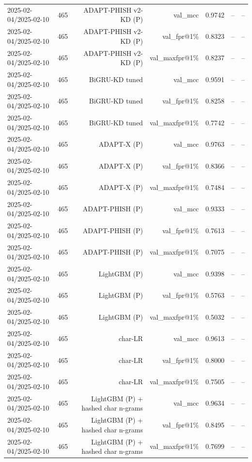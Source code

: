 \begin{table}[t]
\begin{tabular}{llrrrrr}
2025-02-04/2025-02-10 & 465 & ADAPT-PHISH v2-KD (P) & val\_mcc & 0.9742 & -- & -- \\
2025-02-04/2025-02-10 & 465 & ADAPT-PHISH v2-KD (P) & val\_fpr@1\% & 0.8323 & -- & -- \\
2025-02-04/2025-02-10 & 465 & ADAPT-PHISH v2-KD (P) & val\_maxfpr@1\% & 0.8237 & -- & -- \\
2025-02-04/2025-02-10 & 465 & BiGRU-KD tuned & val\_mcc & 0.9591 & -- & -- \\
2025-02-04/2025-02-10 & 465 & BiGRU-KD tuned & val\_fpr@1\% & 0.8258 & -- & -- \\
2025-02-04/2025-02-10 & 465 & BiGRU-KD tuned & val\_maxfpr@1\% & 0.7742 & -- & -- \\
2025-02-04/2025-02-10 & 465 & ADAPT-X (P) & val\_mcc & 0.9763 & -- & -- \\
2025-02-04/2025-02-10 & 465 & ADAPT-X (P) & val\_fpr@1\% & 0.8366 & -- & -- \\
2025-02-04/2025-02-10 & 465 & ADAPT-X (P) & val\_maxfpr@1\% & 0.7484 & -- & -- \\
2025-02-04/2025-02-10 & 465 & ADAPT-PHISH (P) & val\_mcc & 0.9333 & -- & -- \\
2025-02-04/2025-02-10 & 465 & ADAPT-PHISH (P) & val\_fpr@1\% & 0.7613 & -- & -- \\
2025-02-04/2025-02-10 & 465 & ADAPT-PHISH (P) & val\_maxfpr@1\% & 0.7075 & -- & -- \\
2025-02-04/2025-02-10 & 465 & LightGBM (P) & val\_mcc & 0.9398 & -- & -- \\
2025-02-04/2025-02-10 & 465 & LightGBM (P) & val\_fpr@1\% & 0.5763 & -- & -- \\
2025-02-04/2025-02-10 & 465 & LightGBM (P) & val\_maxfpr@1\% & 0.5032 & -- & -- \\
2025-02-04/2025-02-10 & 465 & char-LR & val\_mcc & 0.9613 & -- & -- \\
2025-02-04/2025-02-10 & 465 & char-LR & val\_fpr@1\% & 0.8000 & -- & -- \\
2025-02-04/2025-02-10 & 465 & char-LR & val\_maxfpr@1\% & 0.7505 & -- & -- \\
2025-02-04/2025-02-10 & 465 & LightGBM (P) + hashed char n-grams & val\_mcc & 0.9634 & -- & -- \\
2025-02-04/2025-02-10 & 465 & LightGBM (P) + hashed char n-grams & val\_fpr@1\% & 0.8495 & -- & -- \\
2025-02-04/2025-02-10 & 465 & LightGBM (P) + hashed char n-grams & val\_maxfpr@1\% & 0.7699 & -- & -- \\

\end{tabular}
\end{table}
